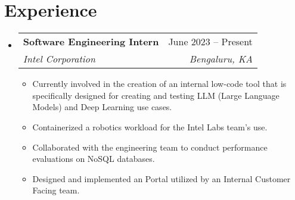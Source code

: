 \documentclass[letterpaper,11pt]{article}
\makeatletter
\newcommand{\resumeItem}[1]{
  \item\small{
    {#1 \vspace{-2pt}}
  }
}
\newcommand{\resumeSubheading}[4]{
  \vspace{-2pt}\item
    \begin{tabular*}{0.97\textwidth}[t]{l@{\extracolsep{\fill}}r}
      \textbf{#1} & #2 \\
      \textit{\small#3} & \textit{\small #4} \\
    \end{tabular*}\vspace{-7pt}
}
\newcommand{\resumeSubSubheading}[2]{
    \item
    \begin{tabular*}{0.97\textwidth}{l@{\extracolsep{\fill}}r}
      \textit{\small#1} & \textit{\small #2} \\
    \end{tabular*}\vspace{-7pt}
}
\newcommand{\resumeSubHeadingListStart}{\begin{itemize}[leftmargin=0.15in, label={}]}
\newcommand{\resumeSubHeadingListEnd}{\end{itemize}}
\newcommand{\resumeItemListStart}{\begin{itemize}}
\newcommand{\resumeItemListEnd}{\end{itemize}\vspace{-5pt}}
\makeatother
\begin{document}
\section{Experience}
  \resumeSubHeadingListStart

    \resumeSubheading
      {Software Engineering Intern}{June 2023 -- Present}
      {Intel Corporation}{Bengaluru, KA}
      \resumeItemListStart
        \resumeItem{Currently involved in the creation of an internal low-code tool that is specifically designed for creating and testing LLM (Large Language Models) and Deep Learning use cases.}
        \resumeItem{Containerized a robotics workload for the Intel Labs team's use.}
        \resumeItem{Collaborated with the engineering team to conduct performance evaluations on NoSQL databases.}
        \resumeItem{Designed and implemented an Portal utilized by an Internal Customer Facing team.}
      \resumeItemListEnd



   \resumeSubHeadingListEnd
%
\end{document}
